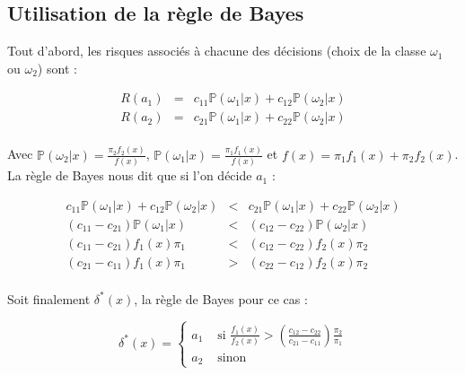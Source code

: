 \documentclass[a4paper,11pt]{article}
\begin{document}
\subsection{Utilisation de la règle de Bayes}

\noindent Tout d'abord, les risques associés à chacune des décisions (choix de la classe $\omega_1$ ou $\omega_2$) sont : 

\begin{center}
   $$ 
   \begin{array}{rcl}
 R(a_1)  &=&  c_{11}\mathbb{P}(\omega_1|x) + c_{12}\mathbb{P}(\omega_2|x) \\
 R(a_2)  &=&  c_{21}\mathbb{P}(\omega_1|x) + c_{22}\mathbb{P}(\omega_2|x) \\
	       \end{array}
   $$
\end{center}

\noindent Avec $\mathbb{P}(\omega_2|x) = \frac{\pi_2 f_2(x)}{f(x)} $, $ \mathbb{P}(\omega_1|x) = \frac{\pi_1 f_1(x)}{f(x)}$ et $   f(x) = \pi_1f_1(x) + \pi_2 f_2(x)$. \\

\noindent La règle de Bayes nous dit que si l'on décide $a_1$ : 

\begin{center}
   $$ 
   \begin{array}{rcl}
 c_{11}\mathbb{P}(\omega_1|x) + c_{12}\mathbb{P}(\omega_2|x)  &<&  c_{21}\mathbb{P}(\omega_1|x) + c_{22}\mathbb{P}(\omega_2|x) \\
 \left(c_{11} -  c_{21} \right) \mathbb{P}(\omega_1|x) &<&   \left(c_{12} -  c_{22} \right)\mathbb{P}(\omega_2|x) \\
 \left(c_{11} - c_{21} \right) f_1(x) \pi_1 &<& \left( c_{12} - c_{22} \right) f_2(x) \pi_2 \\ 
  \left( c_{21} - c_{11} \right) f_1(x) \pi_1 &>& \left( c_{22} - c_{12}  \right) f_2(x) \pi_2 \\ 
	       \end{array}
   $$
\end{center}

\noindent Soit finalement $ \delta^* (x)$, la règle de Bayes pour ce cas : 

$$\delta^* (x) = \left\{\begin{array}{ll}
 a_1 & \mbox{ si $\frac{f_1(x)}{f_2(x)} > \left( \frac{c_{12} - c_{22}}{c_{21} - c_{11}}\right) \frac{\pi_2}{\pi_1}$}\\
 a_2 & \mbox{ sinon }
 \end{array}\right.$$
 
\end{document}
